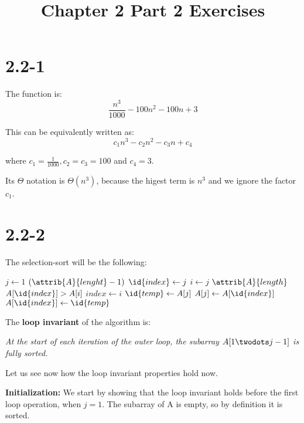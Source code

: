 \documentclass{article}
\title{Chapter 2 Part 2 Exercises}
\begin{document}
\date{}
\author{}

\maketitle

\section*{2.2-1}

The function is:
\begin{equation*}
  \frac{n^3}{1000} - 100 n^2 - 100 n + 3
\end{equation*}

This can be equivalently written as:
\begin{equation*}
  c_1 {n^3} - c_2 n^2 - c_3 n + c_4
\end{equation*}

where $c_1 = \frac{1}{1000}, c_2 = c_3 = 100$ and $c_4 = 3$.

Its $\Theta$ notation is $\Theta(n^3)$, because the higest term is $n^3$ and we ignore the factor $c_1$.

\section*{2.2-2}

The selection-sort will be the following:

\begin{codebox}
  \li \For $j \gets 1$ \To $(\attrib{A}{lenght}-1)$
  \li   \Do            
        $\id{index} \gets j$
  \li   \For $i \gets j$ \To $\attrib{A}{length}$
  \li     \Do
          \If $A[\id{index}] > A[i]$
  \li       \Then
              $index \gets i$
            \End
        \End
  \li     $\id{temp} \gets A[j]$
  \li     $A[j] \gets A[\id{index}]$
  \li   $A[\id{index}] \gets \id{temp}$
      \End
\end{codebox}

The \textbf{loop invariant} of the algorithm is: 

\begin{center} \textit{
  At the start of each iteration of the outer loop, the subarray $A[1 \twodots j-1]$ is fully sorted.}
\end{center}

Let us see now how the loop invariant properties hold now.

\textbf{Initialization:} We start by showing that the loop invariant holds before the first loop operation, when $j = 1$. The subarray of A is empty, so by definition it is sorted. 
\end{document}
